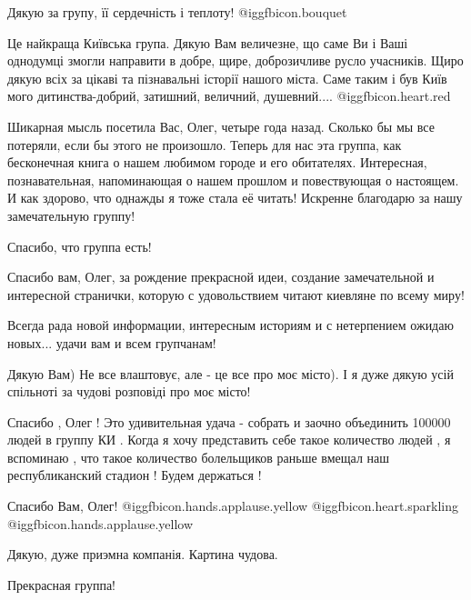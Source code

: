 \begin{itemize}
Дякую за групу, її сердечність і теплоту! @igg{fbicon.bouquet} 


Це найкраща Київська група. Дякую Вам величезне, що саме Ви і Ваші однодумці
змогли направити в добре, щире, доброзичливе русло учасників. Щиро дякую всіх за
цікаві та пізнавальні історії нашого міста. Саме таким і був Київ мого
дитинства-добрий, затишний, величний, душевний.... @igg{fbicon.heart.red}


Шикарная мысль посетила Вас, Олег, четыре года назад. Сколько бы мы все
потеряли, если бы этого не произошло. Теперь для нас эта группа, как
бесконечная книга о нашем любимом городе и его обитателях. Интересная,
познавательная, напоминающая о нашем прошлом и повествующая о настоящем. И как
здорово, что однажды я тоже стала её читать! Искренне благодарю за нашу
замечательную группу!


Спасибо, что группа есть!


Спасибо вам, Олег, за рождение прекрасной идеи, создание замечательной и
интересной странички, которую с удовольствием читают киевляне по всему миру!

Всегда рада новой информации, интересным историям и с нетерпением ожидаю новых...
удачи вам и всем групчанам!


Дякую Вам) Не все влаштовує, але - це все про моє місто). І я дуже дякую усій
спільноті за чудові розповіді про моє місто!


Спасибо , Олег ! Это удивительная удача - собрать и заочно объединить 100000
людей в группу КИ . Когда я хочу представить себе такое количество людей , я
вспоминаю , что такое количество болельщиков раньше вмещал наш республиканский
стадион ! Будем держаться !

Спасибо Вам, Олег! @igg{fbicon.hands.applause.yellow}  @igg{fbicon.heart.sparkling}  @igg{fbicon.hands.applause.yellow} 

Дякую, дуже приэмна компанія. Картина чудова.

Прекрасная группа!


\end{itemize}
